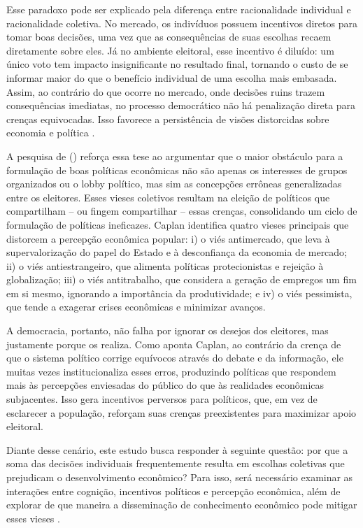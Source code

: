 Esse paradoxo pode ser explicado pela diferença entre racionalidade individual e racionalidade coletiva. No mercado, os indivíduos possuem incentivos diretos para tomar boas decisões, uma vez que as consequências de suas escolhas recaem diretamente sobre eles. Já no ambiente eleitoral, esse incentivo é diluído: um único voto tem impacto insignificante no resultado final, tornando o custo de se informar maior do que o benefício individual de uma escolha mais embasada. Assim, ao contrário do que ocorre no mercado, onde decisões ruins trazem consequências imediatas, no processo democrático não há penalização direta para crenças equivocadas. Isso favorece a persistência de visões distorcidas sobre economia e política \cite{bastiat1859sofismas,downs1957economic,The_Myth_of_the_Rational_Voter}.

A pesquisa de  (\citeyear{The_Myth_of_the_Rational_Voter}) reforça essa tese ao argumentar que o maior obstáculo para a formulação de boas políticas econômicas não são apenas os interesses de grupos organizados ou o lobby político, mas sim as concepções errôneas generalizadas entre os eleitores. Esses vieses coletivos resultam na eleição de políticos que compartilham – ou fingem compartilhar – essas crenças, consolidando um ciclo de formulação de políticas ineficazes. Caplan identifica quatro vieses principais que distorcem a percepção econômica popular: i) o viés antimercado, que leva à supervalorização do papel do Estado e à desconfiança da economia de mercado; ii) o viés antiestrangeiro, que alimenta políticas protecionistas e rejeição à globalização; iii) o viés antitrabalho, que considera a geração de empregos um fim em si mesmo, ignorando a importância da produtividade; e iv) o viés pessimista, que tende a exagerar crises econômicas e minimizar avanços.

A democracia, portanto, não falha por ignorar os desejos dos eleitores, mas justamente porque os realiza. Como aponta Caplan, ao contrário da crença de que o sistema político corrige equívocos através do debate e da informação, ele muitas vezes institucionaliza esses erros, produzindo políticas que respondem mais às percepções enviesadas do público do que às realidades econômicas subjacentes. Isso gera incentivos perversos para políticos, que, em vez de esclarecer a população, reforçam suas crenças preexistentes para maximizar apoio eleitoral.

Diante desse cenário, este estudo busca responder à seguinte questão: por que a soma das decisões individuais frequentemente resulta em escolhas coletivas que prejudicam o desenvolvimento econômico? Para isso, será necessário examinar as interações entre cognição, incentivos políticos e percepção econômica, além de explorar de que maneira a disseminação de conhecimento econômico pode mitigar esses vieses \cite{positive_economics_friedman,Judgment_under_Uncertainty,kahneman2011thinking}.

